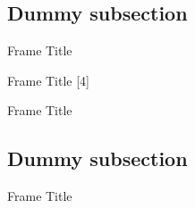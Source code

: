 \subsection{Dummy subsection}
\begin{frame}{Frame Title}
\blindenumerate
\end{frame}

\begin{frame}{Frame Title}
[4]
\end{frame}

\begin{frame}{Frame Title}
\blinddescription
\end{frame}

\subsection{Dummy subsection}
\begin{frame}[allowframebreaks]{Frame Title}
\blindmathpaper
\end{frame}